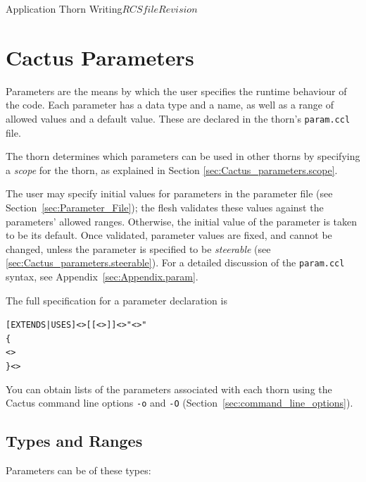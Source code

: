 \begin{cactuspart}{Application Thorn Writing}{$RCSfile$}{$Revision$}
\begin{Lentry}
\end{Lentry}


\chapter{Cactus Parameters}
\label{chap:Cactus_parameters}

Parameters are the means by which the user specifies the runtime behaviour of
the code.  Each parameter has a data type and a name, as well as a
range of allowed values and a default value.  These are declared in the thorn's
\texttt{param.ccl} file.

The thorn determines which parameters can be used in other thorns by
specifying a \textit{scope} for the thorn, as explained in Section
\ref{sec:Cactus_parameters.scope}.

The user may specify initial values for parameters in the parameter file
(see Section~\ref{sec:Parameter_File}); the flesh validates these values
against the parameters' allowed ranges.
Otherwise, the initial value of the parameter is taken to be its default.
Once validated, parameter values are fixed, and cannot be changed,
unless the parameter is specified to be \textit{steerable}
(see \ref{sec:Cactus_parameters.steerable}).
For a detailed discussion of the \texttt{param.ccl} syntax, see
Appendix~\ref{sec:Appendix.param}.

The full specification for a parameter declaration is
\begin{alltt}
[EXTENDS|USES] <>[[<>]] <> "<>"
\{
  <>
\} <>
\end{alltt}

You can obtain lists of the parameters associated with
each thorn using the Cactus command line options \texttt{-o} and \texttt{-O}
(Section~\ref{sec:command_line_options}).



\section{Types and Ranges}
\label{sec:Parameters.Types_and_Ranges}

Parameters can be of these types:


\end{cactuspart}
